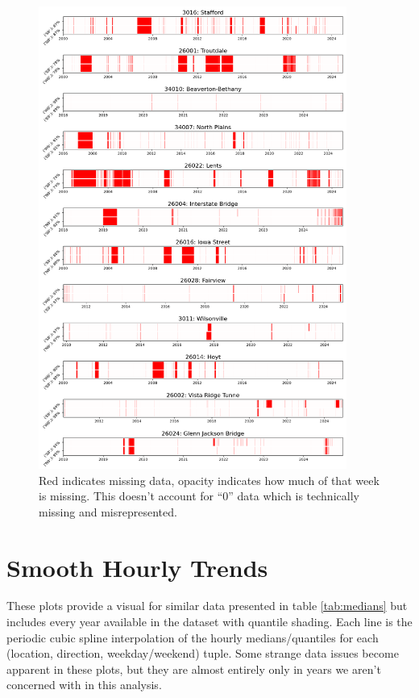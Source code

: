 \documentclass{article}
\begin{document}
\begin{figure}[H] 
    \centering
    \includegraphics[width=0.9\textwidth]{missing_data.png}
    \caption{Red indicates missing data, opacity indicates how much of that week is missing. This doesn't account for ``0'' data which is technically missing and misrepresented.}
    \label{fig:data_availability}
\end{figure}

\section{Smooth Hourly Trends} 

These plots provide a visual for similar data presented in table \ref{tab:medians} but includes every year available in the dataset with quantile shading. Each line is the periodic cubic spline interpolation of the hourly medians/quantiles for each (location, direction, weekday/weekend) tuple. Some strange data issues become apparent in these plots, but they are almost entirely only in years we aren't concerned with in this analysis.



\end{document}
